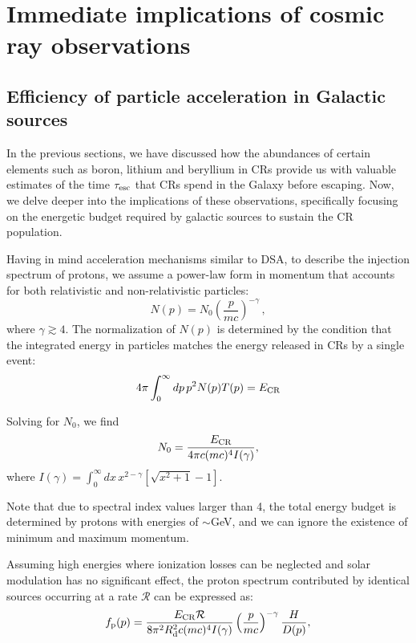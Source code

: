 \section{Immediate implications of cosmic ray observations}
\label{sec:implications}

\subsection{Efficiency of particle acceleration in Galactic sources}

In the previous sections, we have discussed how the abundances of certain elements such as boron, lithium and beryllium in CRs provide us with valuable estimates of the time $\tau_{\rm esc}$ that CRs spend in the Galaxy before escaping.
%
Now, we delve deeper into the implications of these observations, specifically focusing on the energetic budget required by galactic sources to sustain the CR population.

Having in mind acceleration mechanisms similar to DSA, to describe the injection spectrum of protons, we assume a power-law form in momentum that accounts for both relativistic and non-relativistic particles:
%
\begin{equation}
N(p) = N_0 \left(\frac{p}{m c}\right)^{-\gamma} \, , 
\end{equation}
%
where $\gamma \gtrsim 4$. The normalization of $N(p)$ is determined by the condition that the integrated energy in particles matches the energy released in CRs by a single event:
%
\begin{equation}
4 \pi \int_0^\infty dp \, p^2 N(p) T(p) = E_{\rm CR}
\end{equation}

Solving for $N_0$, we find
%
\begin{equation}
N_0 = \frac{E_{\rm CR}}{4 \pi c (m c)^4 I(\gamma)},
\end{equation}
where $I(\gamma) = \int_0^\infty dx \, x^{2-\gamma} \left[ \sqrt{x^2+1} - 1 \right]$.

Note that due to spectral index values larger than 4, the total energy budget is determined by protons with energies of $\sim$GeV, and we can ignore the existence of minimum and maximum momentum.

Assuming high energies where ionization losses can be neglected and solar modulation has no significant effect, the proton spectrum contributed by identical sources occurring at a rate $\mathcal R$ can be expressed as:
%
\begin{equation}
f_{\rm p}(p) = \frac{E_{\rm CR} \mathcal R}{8 \pi^2 R_{\rm d}^2 c (m c)^4 I(\gamma)} \left( \frac{p}{mc}\right)^{-\gamma} \frac{H}{D(p)},
\end{equation}

